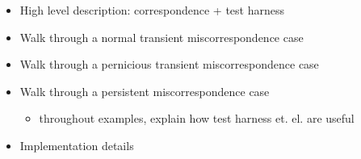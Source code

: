 \begin{itemize}
\item High level description: correspondence + test harness
\item Walk through a normal transient miscorrespondence case
\item Walk through a pernicious transient miscorrespondence case
\item Walk through a persistent miscorrespondence case
\begin{itemize}
  \item throughout examples, explain how test harness et. el. are useful
\end{itemize}
\item Implementation details

\end{itemize}
